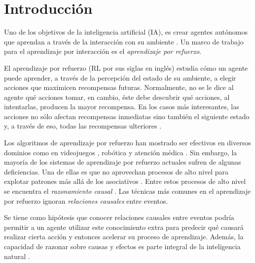 \chapter{Introducción}\label{chapter1}



\graphicspath{{Chapter1/Figs/}}

Uno de los objetivos de la inteligencia artificial (IA), es crear agentes autónomos que aprendan
a través de la interacción con su ambiente \cite{surveyDRL2017}.
Un marco de trabajo para el aprendizaje por interacción es el \textit{aprendizaje por
refuerzo}.


El aprendizaje por refuerzo (RL por sus siglas en inglés) estudia cómo un agente puede aprender, a través de la percepción del estado de su ambiente,
a elegir acciones que maximicen recompensas futuras. 
Normalmente, no se le dice al agente qué acciones
tomar, en cambio, éste debe descubrir qué acciones, al intentarlas, producen la mayor recompensa.
En los casos más interesantes, las acciones no sólo afectan recompensas inmediatas
sino también el siguiente estado y, a través de eso, todas las recompensas ulteriores \cite{sutton_barto_2018}.

Los algoritmos de aprendizaje por refuerzo 
han mostrado ser efectivos en diversos dominios como en videojuegos \cite{mnih2013playing, vinyals2019grandmaster}, 
robótica \cite{openai2019solving}
y atención médica \cite{gottesman2018evaluating}.
Sin embargo, la mayoría de los  sistemas de aprendizaje por refuerzo actuales sufren de algunas deficiencias. Una de ellas es que no aprovechan procesos de
alto nivel para 
explotar patrones más allá de los asociativos \cite{garnelo2016deep, playingagainstnature2018}. Entre estos procesos de alto nivel se encuentra el \textit{razonamiento causal} \cite{pearl_2009, spirtes2000causation}. Las técnicas más comunes
en el aprendizaje por refuerzo ignoran \textit{relaciones causales} entre eventos.

Se tiene como hipótesis que conocer relaciones causales entre eventos podría permitir a un agente 
utilizar este conocimiento extra
para predecir qué causará realizar cierta acción
y entonces acelerar su proceso de aprendizaje.
Además, la capacidad de razonar sobre causas y efectos es parte integral de
la inteligencia natural \cite{nair2019causal}.

